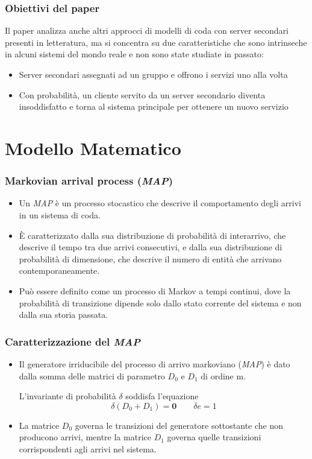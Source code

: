 \documentclass{beamer}
\begin{document}
\begin{frame}
    \frametitle{Obiettivi del paper}
    Il paper analizza anche altri approcci di modelli di coda con server secondari presenti in letteratura, ma si concentra su due caratteristiche che sono intrinseche in alcuni sistemi del mondo reale e non sono state studiate in passato:
    \begin{block}{}
    \begin{itemize}
        \item Server secondari assegnati ad un gruppo e offrono i servizi uno alla volta
        \item Con probabilità, un cliente servito da un server secondario diventa insoddisfatto e torna al sistema principale per ottenere un nuovo servizio
    \end{itemize}
    \end{block}
\end{frame}

\section{Modello Matematico}


\begin{frame}
    \frametitle{Markovian arrival process (\emph{MAP})}
    \begin{itemize}
        \item Un \emph{MAP} è un processo stocastico che descrive il comportamento degli arrivi in un sistema di coda.
        \item È caratterizzato dalla sua distribuzione di probabilità di interarrivo, che descrive il tempo tra due arrivi consecutivi, e dalla sua distribuzione di probabilità di dimensione, che descrive il numero di entità che arrivano contemporaneamente.
        \item Può essere definito come un processo di Markov a tempi continui, dove la probabilità di transizione dipende solo dallo stato corrente del sistema e non dalla sua storia passata.
    \end{itemize}
\end{frame}



\begin{frame}
    \frametitle{Caratterizzazione del \emph{MAP}}
    \begin{itemize}
        \item Il generatore irriducibile del processo di arrivo markoviano (\emph{MAP}) è dato dalla somma delle matrici di parametro $D_0$ e $D_1$ di ordine m.
            \begin{block}{}
                L'invariante di probabilità $\delta$ soddisfa l'equazione
                $$\delta (D_0 + D_1) = \textbf{0} \qquad \delta e = 1$$
            \end{block}
        \item La matrice $D_0$ governa le transizioni del generatore sottostante che non producono arrivi, mentre la matrice $D_1$ governa quelle transizioni corrispondenti agli arrivi nel sistema.
    \end{itemize}
\end{frame}
\end{document}
